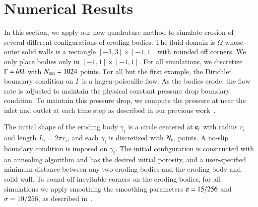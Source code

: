 \documentclass[preprint, 10pt]{elsarticle}
\begin{document}
\section{Numerical Results}
\label{sec:results}
In this section, we apply our new quadrature method to simulate erosion
of several different configurations of eroding bodies.  The fluid domain
is $\Omega$ whose outer solid walls is a rectangle $[-3,3] \times
[-1,1]$ with rounded off corners.  We only place bodies only in $[-1,1]
\times [-1,1]$.  For all simulations, we discretize $\Gamma = {\partial}
\Omega$ with $N_{\mathrm{out}}=1024$ points.  For all but the first example, the
Dirichlet boundary condition on $\Gamma$ is a hagen-poiseuille flow.  As
the bodies erode, the flow rate is adjusted to maintain the physical
constant pressure drop boundary condition.  To maintain this pressure
drop, we compute the pressure at near the inlet and outlet at each time
step as described in our previous work~\cite{qua-moo2018}.

The initial shape of the eroding body $\gamma_i$ is a circle centered at
${\mathbf{c}}_i$ with radius $r_i$ and length $L_i = 2\pi r_i$, and each
$\gamma_i$ is discretized with $N_{\mathrm{in}}$ points.  A no-slip boundary
condition is imposed on $\gamma_i$.  The initial configuration is
constructed with an annealing algorithm and has the desired initial
porosity, and a user-specified minimum distance between any two eroding
bodies and the eroding body and solid wall.  To round off inevitable
corners on the eroding bodies, for all simulations we apply smoothing
the smoothing parameters $\varepsilon=15/256$ and $\sigma=10/256$, as described
in~\cite{qua-moo2018}.  
\end{document}
